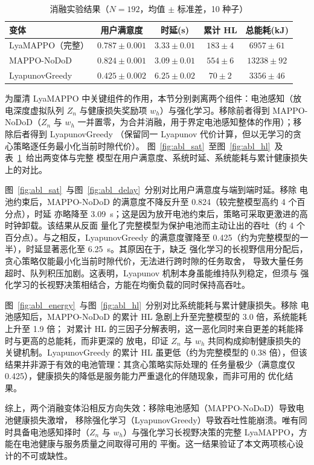 \documentclass[a4paper,11pt]{article}
\begin{document}
\begin{table}[t]\centering
\caption{消融实验结果（$N=192$，均值 $\pm$ 标准差，10 种子）}
\label{tab:ablation}
\begin{tabular}{lcccc}
\hline
变体 & 用户满意度 & 时延(s) & 累计 HL & 总能耗(kJ) \\
\hline
LyaMAPPO（完整） & $0.787\pm0.001$ & $3.33\pm0.01$ & $183\pm4$ & $6957\pm61$ \\
MAPPO-NoDoD & $0.824\pm0.001$ & $3.09\pm0.01$ & $554\pm6$ & $13238\pm92$ \\
LyapunovGreedy & $0.425\pm0.002$ & $6.25\pm0.02$ & $70\pm2$ & $3356\pm46$ \\
\hline
\end{tabular}
\end{table}

为厘清 LyaMAPPO 中关键组件的作用，本节分别剥离两个组件：电池感知（放电深度虚拟队列
$Z_n$ 与健康损失奖励项 $w_h$）与强化学习。移除前者得到 MAPPO-NoDoD（$Z_n$ 与 $w_h$
一并置零，为合并消融，用于界定电池感知整体的作用）；移除后者得到 LyapunovGreedy
（保留同一 Lyapunov 代价计算，但以无学习的贪心策略逐任务最小化当前时隙代价）。
图~\ref{fig:abl_sat}~至图~\ref{fig:abl_hl}~及表~\ref{tab:ablation}~给出两变体与完整
模型在用户满意度、系统时延、系统能耗与累计健康损失上的对比。

图~\ref{fig:abl_sat}~与图~\ref{fig:abl_delay}~分别对比用户满意度与端到端时延。移除
电池约束后，MAPPO-NoDoD 的满意度不降反升至 0.824（较完整模型高约 4 个百分点），时延
亦略降至 3.09~s；这是因为放开电池约束后，策略可采取更激进的高时钟卸载。该结果从反面
量化了完整模型为保护电池而主动让出的吞吐（约 4 个百分点）。与之相反，LyapunovGreedy
的满意度骤降至 0.425（约为完整模型的一半），时延显著恶化至 6.25~s。其原因在于，缺乏
强化学习的长视野信用分配后，贪心策略仅能最小化当前时隙代价，无法进行跨时隙的任务取舍，
导致大量任务超时、队列积压加剧。这表明，Lyapunov 机制本身虽能维持队列稳定，但须与
强化学习的长视野决策相结合，方能在均衡负载的同时保持高吞吐。

图~\ref{fig:abl_energy}~与图~\ref{fig:abl_hl}~分别对比系统能耗与累计健康损失。移除
电池感知后，MAPPO-NoDoD 的累计 HL 急剧上升至完整模型的 3.0 倍，系统能耗上升至 1.9 倍；
对累计 HL 的三因子分解表明，这一恶化同时来自更差的耗能择时与更高的总能耗，而非更深的
放电，印证 $Z_n$ 与 $w_h$ 共同构成抑制健康损失的关键机制。LyapunovGreedy 的累计 HL
虽更低（约为完整模型的 0.38 倍），但该结果并非源于有效的电池管理：其贪心策略实际处理的
任务量极少（满意度仅 0.425），健康损失的降低是服务能力严重退化的伴随现象，而非可用的
优化结果。

综上，两个消融变体沿相反方向失效：移除电池感知（MAPPO-NoDoD）导致电池健康损失激增，
移除强化学习（LyapunovGreedy）导致吞吐性能崩溃。唯有同时具备电池感知择时（$Z_n$ 与
$w_h$）与强化学习长视野决策的完整 LyaMAPPO，方能在电池健康与服务质量之间取得可用的
平衡。这一结果验证了本文两项核心设计的不可或缺性。
\end{document}
